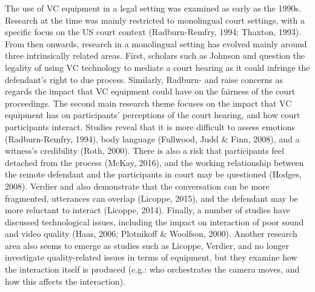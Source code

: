 \documentclass[output=paper]{langsci/langscibook}
\begin{document}
The use of VC equipment in a legal setting was examined as early as the 1990s. Research at the time was mainly restricted to monolingual court settings, with a specific focus on the US court context (Radburn-Remfry, 1994; Thaxton, 1993). From then onwards, research in a monolingual setting has evolved mainly around three intrinsically related areas. First, scholars such as Johnson and \citet{Wiggins2006} question the legality of using VC technology to mediate a court hearing as it could infringe the defendant’s right to due process. Similarly, Radburn-\citet{Remfry1994} and \citet{Thaxton1993} raise concerns as regards the impact that VC equipment could have on the fairness of the court proceedings. The second main research theme focuses on the impact that VC equipment has on participants’ perceptions of the court hearing, and how court participants interact. Studies reveal that it is more difficult to assess emotions (Radburn-Remfry, 1994), body language (Fullwood, Judd \& Finn, 2008), and a witness’s credibility (Roth, 2000). There is also a risk that participants feel detached from the process (McKay, 2016), and the working relationship between the remote defendant and the participants in court may be questioned (Hodges, 2008). Verdier and \citet{Licoppe2011} also demonstrate that the conversation can be more fragmented, utterances can overlap (Licoppe, 2015), and the defendant may be more reluctant to interact (Licoppe, 2014). Finally, a number of studies have discussed technological issues, including the impact on interaction of poor sound and video quality (Haas, 2006; Plotnikoff \& Woolfson, 2000). Another research area also seems to emerge as studies such as Licoppe, Verdier, and \citet{Dumoulin2013} no longer investigate quality-related issues in terms of equipment, but they examine how the interaction itself is produced (e.g.: who orchestrates the camera moves, and how this affects the interaction). 
\end{document}
